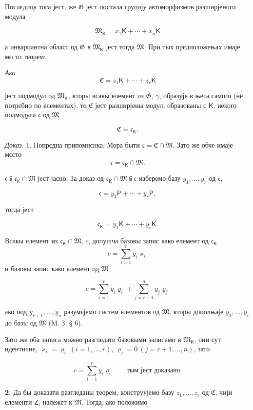 \documentclass[11pt]{article}
\begin{document}
Послєдица тога јест, же \(\mathfrak G\) јест постала групоју автоморфизмов разширјеного модула

\[
\mathfrak M_{\mathsf K}=x_1\mathsf K+\cdots+x_n\mathsf K
\]

а инвариантна област од \(\mathfrak G\) в \(\mathfrak M_{\mathsf K}\) јест тогда \(\mathfrak M\). При тых прєдположењах имаје мєсто теорем:

\begingroup\itshape
Ако
\[
\mathfrak C=z_1\mathsf K+\cdots+z_r\mathsf K
\]

јест подмодул од \(\mathfrak M_{\mathsf K}\), кторы всакы елемент из \(\mathfrak G\), \(\gamma\), образује в њега самого (не потрєбно по елементах), то \(\mathfrak C\) јест разширјены модул, образованы с \(\mathsf K\), некого подмодула \(\mathfrak c\) од \(\mathfrak M\).

\[
\mathfrak C=\mathfrak c_{\mathsf K}.
\]
\endgroup

\emph{Доказ.} 1. Попрєдна припомнєнка: Мора быти \(\mathfrak c=\mathfrak C\cap\mathfrak M\). Зато же обче имаје мєсто
\[
\mathfrak c=\mathfrak c_{\mathsf K}\cap\mathfrak M.
\]

\(\mathfrak c\subseteqq\mathfrak c_{\mathsf K}\cap\mathfrak M\) јест јасно. За доказ од \(\mathfrak c_{\mathsf K}\cap\mathfrak M\subseteqq\mathfrak c\) изберемо базу \(y_1,\ldots,y_r\) од \(\mathfrak c\),

\[
\mathfrak c=y_1\mathsf P+\cdots+y_r\mathsf P,
\]

тогда јест

\[
\mathfrak c_{\mathsf K}=y_1\mathsf K+\cdots+y_r\mathsf K.
\]

Всакы елемент из \(\mathfrak c_{\mathsf K}\cap\mathfrak M\), \(c\), допушча базовы запис како елемент од \(\mathfrak c_{\mathsf K}\)
\[
c=\sum_{i=1}^{r}y_i\varkappa_i
\]
и базовы запис како елемент од \(\mathfrak M\)

\[
c=\sum_{i=1}^{r}y_i\varrho_i+\sum_{j=r+1}^{n}y_j\varrho_j
\]

ако под \(y_{r+1},\ldots,y_n\) разумєјемо систем елементов од \(\mathfrak M\), кторы дополњаје \(y_1,\ldots,y_r\) до базы од \(\mathfrak M\) (M. З. § 6).

Зато же оба записа можно разгледати базовыми записами в \(\mathfrak M_{\mathsf K}\), они сут идентичне, \(\varkappa_i=\varrho_i\ (i=1,\ldots,r)\), \(\varrho_j=0\ (j=r+1,\ldots,n)\), зато

\[
c=\sum_{i=1}^{r}y_i\varrho_i
\qquad\text{тым јест доказано.}
\]

\textbf{2.} Да бы доказати разгледаны теорем, конструујемо базу \(z_1,\ldots,z_r\) од \(\mathfrak C\), чији елементи \(\mathsf{Z}_i\) належет к \(\mathfrak M\). Тогда, ако положимо
\end{document}
